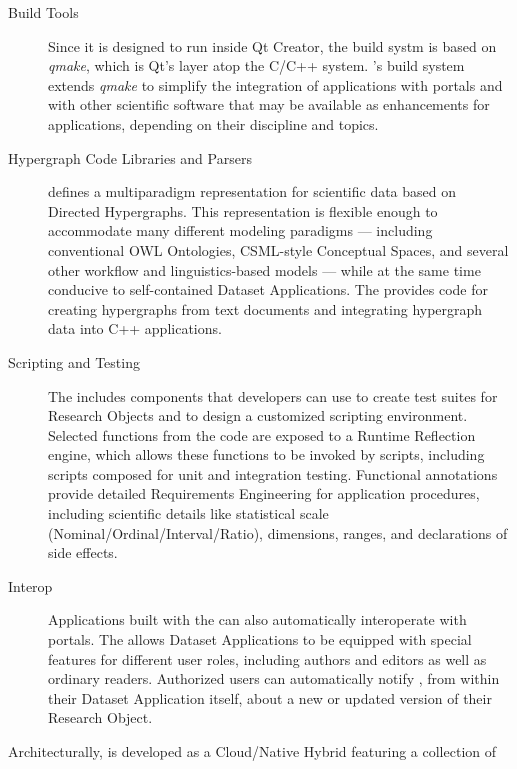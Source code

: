\documentclass[10pt,letterpaper]{article}
\begin{document}
\begin{description}
\item[Build Tools]  Since it is designed to run 
inside Qt Creator, the {\RAK} build systm 
is based on \textit{qmake}, which is Qt's 
layer atop the C/C++  system.  
{\lMOSAIC}'s build system extends \textit{qmake} to 
simplify the integration of {\RAK} applications 
with {\MOSAIC} portals and with other scientific 
software that may be available as enhancements 
for {\RAK} applications, depending on their 
discipline and topics.

\item[Hypergraph Code Libraries and Parsers]  
{\lMOSAIC} defines a multiparadigm representation for 
scientific data based on Directed Hypergraphs.  
This representation is flexible enough to 
accommodate many different modeling 
paradigms --- including 
conventional OWL Ontologies, 
CSML-style Conceptual Spaces, and 
several other workflow and linguistics-based models 
--- while at the same time conducive to self-contained 
Dataset Applications.  The {\MOSAIC} {\SDK} provides 
code for creating hypergraphs from text documents and 
integrating hypergraph data into C++ applications.

\item[Scripting and Testing]  The {\MOSAIC} {\SDK} includes 
components that developers can use to create 
test suites for Research Objects and to design a 
customized scripting environment.  Selected 
functions from the {\RO} code are exposed 
to a Runtime Reflection engine, which allows these 
functions to be invoked by scripts, including 
scripts composed for unit and integration testing.  
Functional annotations provide detailed Requirements 
Engineering for application procedures, including scientific 
details like statistical scale (Nominal/Ordinal/Interval/Ratio),
dimensions, ranges, and declarations of side effects.

\item[{\lMOSAIC} Interop]  Applications built 
with the {\MOSAIC} {\SDK} can also automatically 
interoperate with {\MOSAIC} portals.  The {\SDK} 
allows Dataset Applications to be equipped 
with special features for different user roles, 
including authors and editors as well as ordinary readers.  
Authorized 
users can automatically notify {\MOSAIC}, 
from within their Dataset Application itself, about 
a new or updated version of their Research Object.
\end{description}
\p{}
Architecturally, {\MOSAIC} is developed as a 
Cloud/Native Hybrid featuring a collection of 
\end{document}
